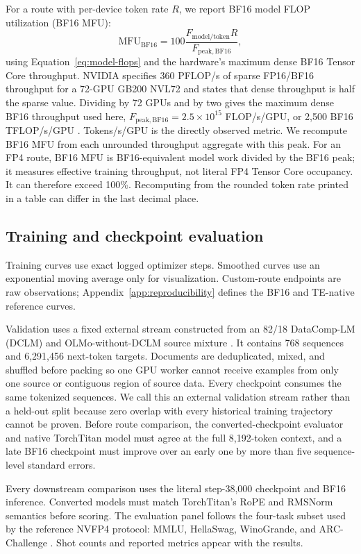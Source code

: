 For a route with per-device token rate $R$, we report BF16 model FLOP
utilization (BF16 MFU):
\begin{equation}
  \mathrm{MFU}_{\mathrm{BF16}}=100\frac{F_{\mathrm{model/token}}R}
  {F_{\mathrm{peak,BF16}}},
  \label{eq:mfu}
\end{equation}
using Equation~\ref{eq:model-flops} and the hardware's maximum dense BF16
Tensor Core throughput. NVIDIA specifies 360 PFLOP/s of sparse FP16/BF16
throughput for a 72-GPU GB200 NVL72 and states that dense throughput is half
the sparse value. Dividing by 72 GPUs and by two gives the maximum dense BF16
throughput used here, $F_{\mathrm{peak,BF16}}=2.5\times10^{15}$ FLOP/s/GPU,
or 2,500 BF16 TFLOP/s/GPU \cite{nvidia2025blackwell}. Tokens/s/GPU is the
directly observed metric. We recompute BF16 MFU from each unrounded throughput
aggregate with this peak. For an FP4 route, BF16 MFU is BF16-equivalent model
work divided by the BF16 peak; it measures effective training throughput, not
literal FP4 Tensor Core occupancy. It can therefore exceed 100\%.
Recomputing from the rounded token rate printed in a table can differ in the
last decimal place.

\subsection{Training and checkpoint evaluation}

Training curves use exact logged optimizer steps. Smoothed curves use an
exponential moving average only for visualization. Custom-route endpoints are
raw observations; Appendix~\ref{app:reproducibility} defines the BF16 and
TE-native reference curves.

Validation uses a fixed external stream constructed from an 82/18 DataComp-LM
(DCLM) and OLMo-without-DCLM source mixture
\cite{li2024datacomplm,olmo2025olmo2}. It contains 768
sequences and 6,291,456 next-token targets. Documents are deduplicated, mixed,
and shuffled before packing so one GPU worker cannot receive examples from
only one source or contiguous region of source data. Every checkpoint consumes
the same tokenized sequences. We
call this an external validation stream rather than a held-out split because
zero overlap with every historical training trajectory cannot be proven.
Before route comparison, the converted-checkpoint evaluator and native
TorchTitan model must agree at the full 8,192-token context, and a late BF16
checkpoint must improve over an early one by more than five sequence-level
standard errors.

Every downstream comparison uses the literal step-38,000 checkpoint and BF16
inference. Converted models must match TorchTitan's RoPE and RMSNorm semantics
before scoring. The evaluation panel follows the four-task subset used by the
reference NVFP4 protocol: MMLU, HellaSwag, WinoGrande, and ARC-Challenge
\cite{hendrycks2021mmlu,gu2024olmes,nvidia2025nvfp4}. Shot counts and reported metrics appear with the
results.
